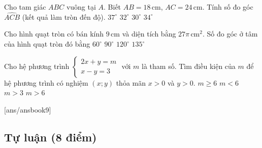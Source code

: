 \begin{ex}
Cho tam giác $ABC$ vuông tại $A$. Biết $AB=18\,\text{cm}$, $AC=24\,\text{cm}$. Tính số đo góc $\widehat{ACB}$ (kết quả làm tròn đến độ).
\choice
{\True $37^\circ$}
{$32^\circ$}
{$30^\circ$}
{$34^\circ$}
\end{ex}

\begin{ex}
Cho hình quạt tròn có bán kính $9\,\text{cm}$ và diện tích bằng $27\pi\,\text{cm}^2$. Số đo góc ở tâm của hình quạt tròn đó bằng
\choice
{$60^\circ$}
{$90^\circ$}
{\True $120^\circ$}
{$135^\circ$}
\end{ex}

\begin{ex}
Cho hệ phương trình
$\begin{cases}
2x+y=m\\
x-y=3
\end{cases}$
với $m$ là tham số. Tìm điều kiện của $m$ để hệ phương trình có nghiệm $(x;y)$ thỏa mãn $x>0$ và $y>0$.
\choice
{$m\ge 6$}
{$m<6$}
{$m>3$}
{\True $m>6$}
\end{ex}



[ans/ansbook9] 
\setcounter{bt}{0} 
\subsection{Tự luận (8 điểm)}

